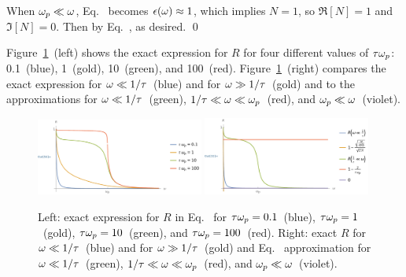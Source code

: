 {	When $\omega_p \ll \omega$, Eq.~ becomes $\epsilon(\omega) \approx 1$, which implies $N = 1$, so $\Re[N] = 1$ and $\Im[N] = 0$.  Then by Eq.~,
	as desired. \qed

	Figure~\ref{f3c}~(left) shows the exact expression for $R$ for four different values of $\tau \omega_p$: 0.1~(blue), 1~(gold), 10~(green), and 100~(red).  Figure~\ref{f3c}~(right) compares the exact expression for $\omega \ll 1 / \tau$~(blue) and for $\omega \gg 1 / \tau$~(gold) and to the approximations for $\omega \ll 1 / \tau$~(green), $1 / \tau \ll \omega \ll \omega_p$~(red), and $\omega_p \ll \omega$~(violet).

	\begin{figure}[t]
		\includegraphics[width=0.49\textwidth,trim=1.5cm 0 0 0,clip]{3c} \hfill
		\includegraphics[width=0.49\textwidth,trim=1.5cm 0 0 0,clip]{3c2}
		\caption{Left: exact expression for $R$ in Eq.~ for $\tau \omega_p = 0.1$~(blue), $\tau \omega_p = 1$~(gold), $\tau \omega_p = 10$~(green), and $\tau \omega_p = 100$~(red).  Right: exact $R$ for $\omega \ll 1 / \tau$~(blue) and for $\omega \gg 1 / \tau$~(gold) and Eq.~ approximation for $\omega \ll 1 / \tau$~(green), $1 / \tau \ll \omega \ll \omega_p$~(red), and $\omega_p \ll \omega$~(violet).}
		\label{f3c}
	\end{figure}
}